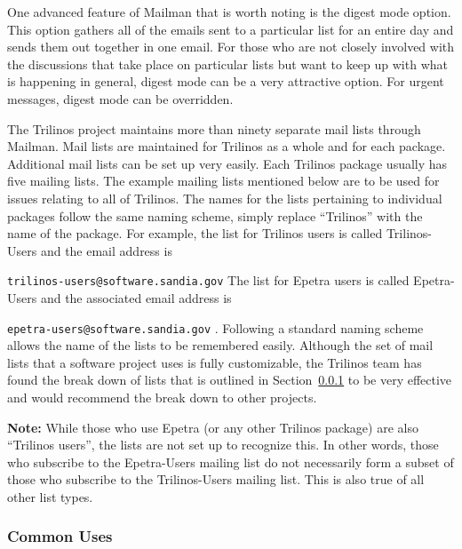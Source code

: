 \documentclass[12pt,relax]{article}
\newcommand{\InlineCommand}[1]{
  {\hspace{0.01 in}} {\tt #1} {\hspace{0.01 in}}}
\begin{document}
One advanced feature of Mailman that is worth noting is the digest mode option.
This option gathers all of the emails sent to a particular list for an entire 
day and sends them out together in one email.  For those who are not closely 
involved with the discussions that take place on particular lists but want to 
keep up with what is happening in general, digest mode can be a very 
attractive option.  For urgent messages, digest mode can 
be overridden.

The Trilinos project maintains more than ninety separate mail lists through 
Mailman.  Mail lists are maintained for Trilinos as a whole and for each 
package.  Additional mail lists can be set up very easily.  Each Trilinos 
package usually has five mailing lists.  The example mailing lists mentioned 
below are to be used for issues relating to all of Trilinos.  
The names for the lists pertaining to individual packages follow the same 
naming scheme, simply replace ``Trilinos'' with the name of the package.  For example, the list for Trilinos users is 
called Trilinos-Users and the email address is 
\InlineCommand{trilinos-users@software.sandia.gov}  The list 
for Epetra users is called Epetra-Users and the associated email address is 
\InlineCommand{epetra-users@software.sandia.gov}.  Following a standard naming
scheme allows the name of the lists to be remembered easily.  Although the 
set of mail lists that a software project uses is fully customizable, the 
Trilinos team has found the break down of lists that is outlined in 
Section~\ref{subsubsect:MailmanUses} to be very effective 
and would recommend the break down to other projects.

{\bf Note:}
While those who use Epetra (or any other Trilinos package) are also
``Trilinos users'', the lists are not set up to recognize this.  In other 
words, those who subscribe to the Epetra-Users mailing list do not necessarily 
form a subset of those who subscribe to the Trilinos-Users mailing list.  This 
is also true of all other list types.  

\subsubsection{Common Uses}
\label{subsubsect:MailmanUses}
\end{document}
